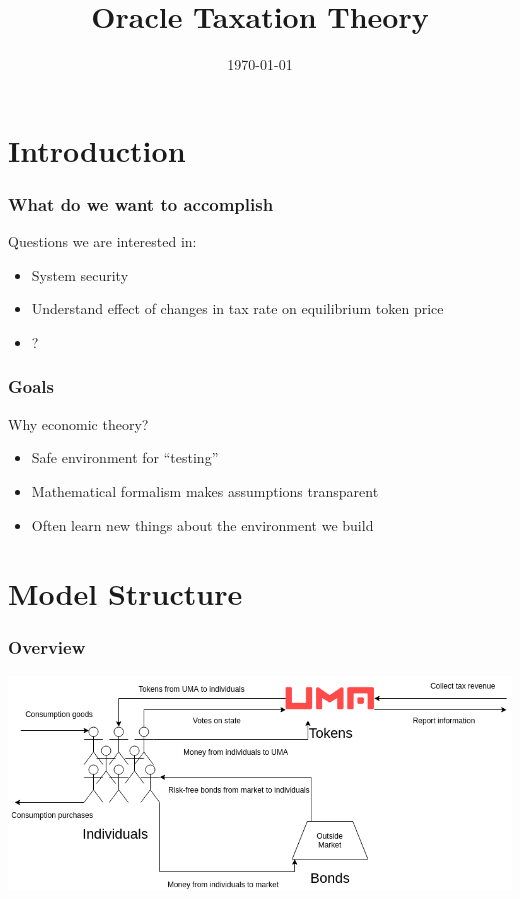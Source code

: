 \documentclass[10pt]{beamer}
\title{Oracle Taxation Theory}
\date[]{\today}
\begin{document}
\begin{frame}
  \titlepage
\end{frame}

\section{Introduction}

\begin{frame} \frametitle{What do we want to accomplish}

  Questions we are interested in:

  \begin{itemize}
    \item System security
    \item Understand effect of changes in tax rate on equilibrium token price
    \item ?
  \end{itemize}

\end{frame}

\begin{frame} \frametitle{Goals}

  Why economic theory?

  \begin{itemize}
    \item Safe environment for ``testing''
    \item Mathematical formalism makes assumptions transparent
    \item Often learn new things about the environment we build
  \end{itemize}

\end{frame}

\section{Model Structure}

\begin{frame} \frametitle{Overview}

  \begin{center}
    \includegraphics[width=0.8\paperwidth]{ModelOverview.png}
  \end{center}

\end{frame}
\end{document}
